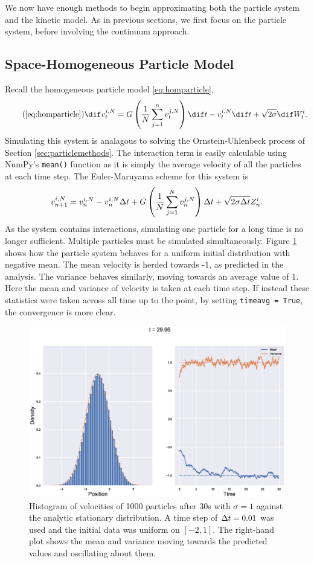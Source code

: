 We now have enough methods to begin approximating both the particle system and the kinetic model. As in previous sections, we first focus on the particle system, before involving the continuum approach. 
\subsection{Space-Homogeneous Particle Model}\label{sec:homparticles}
Recall the homogeneous particle model \eqref{eq:homparticle},
\begin{equation}\tag{\ref{eq:homparticle}}
\dif v^{i,N}_t = G\left(\frac{1}{N}\sum_{j=1}^n v^{j,N}_t\right)\dif t-v^{i,N}_t \dif t + \sqrt{2\sigma} \dif W^i_t.
\end{equation}
Simulating this system is analagous to solving the Ornstein-Uhlenbeck process of Section \ref{sec:particlemethods}. The interaction term is easily calculable using NumPy's \texttt{mean()} function as it is simply the average velocity of all the particles at each time step. The Euler-Maruyama scheme for this system is
\[ v^{i,N}_{n+1} = v^{i,N}_n - v^{i,N}_n\Delta t + G\left(\frac{1}{N}\sum_{j=1}^N v^{j,N}_n\right)\Delta t+ \sqrt{2\sigma\Delta t} Z^i_n. \]
As the system contains interactions, simulating one particle for a long time is no longer sufficient. Multiple particles must be simulated simultaneously. Figure \ref{fig:homparticlemoments} shows how the particle system behaves for a uniform initial distribution with negative mean. The mean velocity is herded towards -1, as predicted in the analysis. The variance behaves similarly, moving towards an average value of 1. Here the mean and variance of velocity is taken at each time step. If instead these statistics were taken across all time up to the point, by setting \texttt{timeavg = True}, the convergence is more clear.
\begin{figure}
    \centering
    \includegraphics[width=\linewidth]{Figures/homparticles}
    \caption[Homogeneous Particle System]{Histogram of velocities of 1000 particles after 30s with $\sigma = 1$ against the analytic stationary distribution. A time step of $\Delta t = 0.01$ was used and the initial data was uniform on $[-2,1]$. The right-hand plot shows the mean and variance moving towards the predicted values and oscillating about them.}
    \label{fig:homparticlemoments}
\end{figure}
